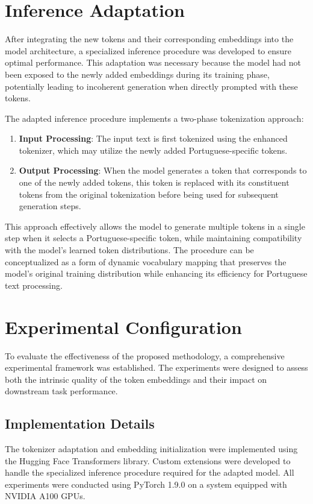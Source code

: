 \section{Inference Adaptation}
After integrating the new tokens and their corresponding embeddings into the model architecture, a specialized inference procedure was developed to ensure optimal performance. This adaptation was necessary because the model had not been exposed to the newly added embeddings during its training phase, potentially leading to incoherent generation when directly prompted with these tokens.

The adapted inference procedure implements a two-phase tokenization approach:

\begin{enumerate}
    \item \textbf{Input Processing}: The input text is first tokenized using the enhanced tokenizer, which may utilize the newly added Portuguese-specific tokens.
    
    \item \textbf{Output Processing}: When the model generates a token that corresponds to one of the newly added tokens, this token is replaced with its constituent tokens from the original tokenization before being used for subsequent generation steps.
\end{enumerate}

This approach effectively allows the model to generate multiple tokens in a single step when it selects a Portuguese-specific token, while maintaining compatibility with the model's learned token distributions. The procedure can be conceptualized as a form of dynamic vocabulary mapping that preserves the model's original training distribution while enhancing its efficiency for Portuguese text processing.

\section{Experimental Configuration}
To evaluate the effectiveness of the proposed methodology, a comprehensive experimental framework was established. The experiments were designed to assess both the intrinsic quality of the token embeddings and their impact on downstream task performance.

\subsection{Implementation Details}
The tokenizer adaptation and embedding initialization were implemented using the Hugging Face Transformers library. Custom extensions were developed to handle the specialized inference procedure required for the adapted model. All experiments were conducted using PyTorch 1.9.0 on a system equipped with NVIDIA A100 GPUs.

